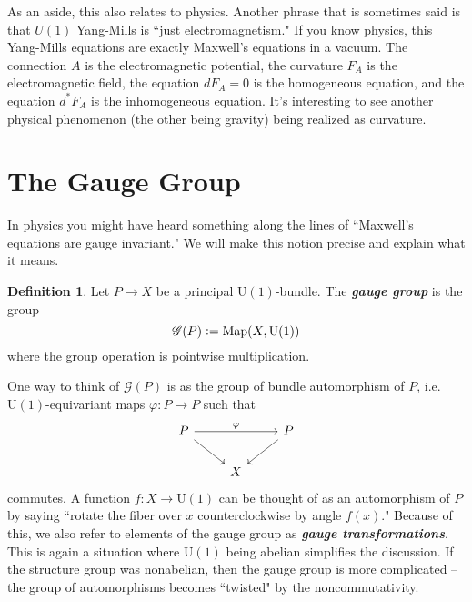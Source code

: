 \documentclass[psamsfonts, 12pt]{amsart}
\theoremstyle{definition}
\newtheorem{defn}[thm]{Definition}
\theoremstyle{remark}
\newcommand{\ib}[1]{\textbf{\textit{#1}}}
\newcommand{\defeq}{\vcentcolon=}
\begin{document}
As an aside, this also relates to physics. Another phrase that is sometimes said
is that $U(1)$ Yang-Mills is ``just electromagnetism." If you know physics,
this Yang-Mills equations are exactly Maxwell's equations in a vacuum. The connection
$A$ is the electromagnetic potential, the curvature $F_A$ is the electromagnetic field,
the equation $dF_A = 0$ is the homogeneous equation, and the equation $d^*F_A$ is the
inhomogeneous equation. It's interesting to see another physical phenomenon (the other
being gravity) being realized as curvature.
%
\section{The Gauge Group}
%
In physics you might have heard something along the lines of ``Maxwell's equations
are gauge invariant." We will make this notion precise and explain what it means.
%
\begin{defn}
Let $P \to X$ be a principal $\mathrm{U}(1)$-bundle. The \ib{gauge group} is the group
\[
\mathscr{G}(P) \defeq \mathrm{Map}(X,\mathrm{U}(1))
\]
where the group operation is pointwise multiplication.
\end{defn}
%
One way to think of $\mathscr{G}(P)$ is as the group of bundle automorphism of $P$,
i.e. $\mathrm{U}(1)$-equivariant maps $\varphi : P \to P$ such that
\[\begin{tikzcd}
P \ar[dr]\ar[rr,"\varphi"] && P \ar[dl]\\
& X
\end{tikzcd}\]
commutes. A function $f : X \to \mathrm{U}(1)$ can be thought of as an automorphism
of $P$ by saying ``rotate the fiber over $x$ counterclockwise by angle $f(x)$."
Because of this, we also refer to elements of the gauge group as
\ib{gauge transformations}. This is again a situation where $\mathrm{U}(1)$ being
abelian simplifies the discussion. If the structure group was nonabelian, then the gauge
group is more complicated -- the group of automorphisms becomes ``twisted" by the
noncommutativity. \\
\end{document}
